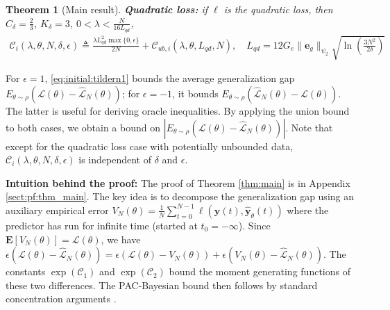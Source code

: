 \documentclass{article}
\def\rve{{\mathbf{e}}}
\def\rvy{{\mathbf{y}}}
\newtheorem{theorem}{Theorem}[section]
\newcommand{\e}{\mathbf{e}}
\newcommand{\bE}{\mathbf{E}}
\begin{document}
\begin{theorem}[Main result]
 \textbf{Quadratic loss:}   
   if $\ell$ is the quadratic loss, then $C_{\delta}=\frac{2}{3}$, 
   $K_{\delta}=3$,
   $0 < \lambda < \frac{N}{16 L_{qd}}$,
  \begin{equation*}
  \begin{aligned}
     \mathcal{C}_i(\lambda,\theta,N,\delta,\epsilon)  \triangleq  
     \frac{\lambda L^2_{qd} \max\{0,\epsilon\}}{2N} +
       \mathcal{C}_{ub,i}\left(\lambda,\theta,L_{qd},
       N\right), \quad   L_{qd}=12G_e\|\e_g\|_{\psi_2}\sqrt{\ln\left(\frac{3N^2}{2\delta}\right)} 
  \end{aligned}
  \end{equation*}
\end{theorem}
  For $\epsilon=1$, \eqref{eq:initial:tildern1} bounds the average generalization gap $E_{\theta \sim \rho}(\mathcal{L}(\theta) - \hat{\mathcal{L}}_N(\theta))$; 
  for $\epsilon=-1$, it bounds $E_{\theta \sim \rho}(\hat{\mathcal{L}}_N(\theta) - \mathcal{L}(\theta))$. 
  The latter is useful for deriving oracle inequalities. By applying the union bound to both cases, we obtain a bound on $\left|E_{\theta \sim \rho}(\mathcal{L}(\theta) - \hat{\mathcal{L}}_N(\theta))\right|$.
  Note that except for the quadratic loss case with potentially unbounded data, 
  $\mathcal{C}_i(\lambda,\theta,N,\delta,\epsilon)$ is independent of $\delta$ and $\epsilon$.


  \textbf{Intuition behind the proof:}
  The proof of Theorem \ref{thm:main} is in Appendix \ref{sect:pf:thm_main}. 
  The key idea is to decompose the generalization gap using an auxiliary empirical error 
    \( V_N(\theta) = \frac{1}{N}\sum_{t=0}^{N-1}\ell(\rvy(t),\hat{\rvy}_\theta(t)) \)
    where the predictor has run for infinite time (started at $t_0=-\infty$). Since $\bE[V_N(\theta)]=\mathcal{L}(\theta)$, we have 
    \(\epsilon(\mathcal{L}(\theta) - \hat{\mathcal{L}}_N(\theta)) = \epsilon (\mathcal{L}(\theta) - V_N(\theta)) + \epsilon (V_N(\theta) - \hat{\mathcal{L}}_N(\theta)) \).
    The constants $\exp(\mathcal{C}_1)$ and $\exp(\mathcal{C}_2)$ bound the moment generating functions of these two differences. The PAC-Bayesian bound then follows by standard concentration arguments \cite[Chapter 2]{alquier2021userfriendly}.
    
\end{document}
